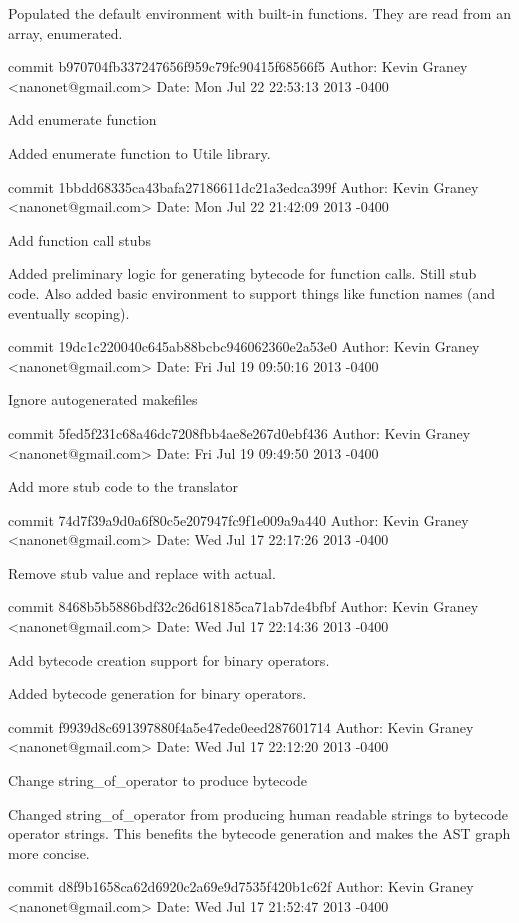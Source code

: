     Populated the default environment with built-in functions.  They
    are read from an array, enumerated.

commit b970704fb337247656f959c79fc90415f68566f5
Author: Kevin Graney <nanonet@gmail.com>
Date:   Mon Jul 22 22:53:13 2013 -0400

    Add enumerate function
    
    Added enumerate function to Utile library.

commit 1bbdd68335ca43bafa27186611dc21a3edca399f
Author: Kevin Graney <nanonet@gmail.com>
Date:   Mon Jul 22 21:42:09 2013 -0400

    Add function call stubs
    
    Added preliminary logic for generating bytecode for function
    calls.  Still stub code.  Also added basic environment to support
    things like function names (and eventually scoping).

commit 19dc1c220040c645ab88bcbc946062360e2a53e0
Author: Kevin Graney <nanonet@gmail.com>
Date:   Fri Jul 19 09:50:16 2013 -0400

    Ignore autogenerated makefiles

commit 5fed5f231c68a46dc7208fbb4ae8e267d0ebf436
Author: Kevin Graney <nanonet@gmail.com>
Date:   Fri Jul 19 09:49:50 2013 -0400

    Add more stub code to the translator

commit 74d7f39a9d0a6f80c5e207947fc9f1e009a9a440
Author: Kevin Graney <nanonet@gmail.com>
Date:   Wed Jul 17 22:17:26 2013 -0400

    Remove stub value and replace with actual.

commit 8468b5b5886bdf32c26d618185ca71ab7de4bfbf
Author: Kevin Graney <nanonet@gmail.com>
Date:   Wed Jul 17 22:14:36 2013 -0400

    Add bytecode creation support for binary operators.
    
    Added bytecode generation for binary operators.

commit f9939d8c691397880f4a5e47ede0eed287601714
Author: Kevin Graney <nanonet@gmail.com>
Date:   Wed Jul 17 22:12:20 2013 -0400

    Change string_of_operator to produce bytecode
    
    Changed string_of_operator from producing human readable strings
    to bytecode operator strings.  This benefits the bytecode generation
    and makes the AST graph more concise.

commit d8f9b1658ca62d6920c2a69e9d7535f420b1c62f
Author: Kevin Graney <nanonet@gmail.com>
Date:   Wed Jul 17 21:52:47 2013 -0400


